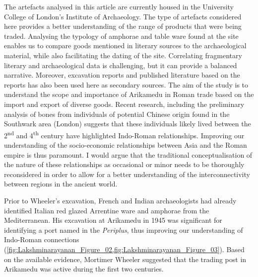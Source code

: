 The artefacts analysed in this article are currently housed in the University College of London’s Institute of Archaeology. The type of artefacts considered here provides a better understanding of the range of products that were being traded. Analysing the typology of amphorae and table ware found at the site enables us to compare goods mentioned in literary sources to the archaeological material, while also facilitating the dating of the site. Correlating fragmentary literary and archaeological data is challenging, but it can provide a balanced narrative. Moreover, excavation reports and published literature based on the reports has also been used here as secondary sources. The aim of the study is to understand the scope and importance of Arikamedu in Roman trade based on the import and export of diverse goods. Recent research, including the preliminary analysis of bones from individuals of potential Chinese origin found in the Southwark area (London) suggests that these individuals likely lived between the 2\textsuperscript{nd} and 4\textsuperscript{th} century\AD \parencite{redfern2016} have highlighted Indo-Roman relationships. Improving our understanding of the socio-economic relationships between Asia and the Roman empire is thus paramount. I would argue that the traditional conceptualisation of the nature of these relationships as occasional or minor needs to be thoroughly reconsidered in order to allow for a better understanding of the interconnectivity between regions in the ancient world.


Prior to Wheeler’s excavation, French and Indian archaeologists had already identified Italian red glazed Arrentine ware and amphorae from the Mediterranean. His excavation at Arikamedu in 1945 was significant for identifying a port named in the \emph{Periplus}, thus improving our understanding of Indo-Roman connections (\cref{fig:Lakshminarayanan_Figure_02,fig:Lakshminarayanan_Figure_03}). Based on the available evidence, Mortimer Wheeler suggested that the trading post in Arikamedu was active during the first two centuries\AD.

